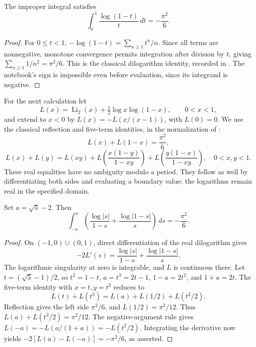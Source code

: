 \begin{proposition}\leavevmode\par\noindent\ours\quad
The improper integral satisfies
\[
 \int_0^1\frac{\log(1-t)}{t}\,dt=-\frac{\pi^2}{6}.
\]
\end{proposition}
\begin{proof}
For \(0\le t<1\), \(-\log(1-t)=\sum_{n\ge1}t^n/n\). Since all terms are nonnegative, monotone convergence permits integration after division by \(t\), giving \(\sum_{n\ge1}1/n^2=\pi^2/6\). This is the classical dilogarithm identity, recorded in \citet[Eqs.~25.12.1--2]{nist2026polylogarithms}. The notebook's sign is impossible even before evaluation, since its integrand is negative.
\end{proof}

For the next calculation let
\[
 L(x)=\operatorname{Li}_2(x)+\tfrac12\log x\log(1-x),\qquad0<x<1,
\]
and extend to \(x<0\) by \(L(x)=-L(x/(x-1))\), with \(L(0)=0\). We use the classical reflection and five-term identities, in the normalization of \citet[Chapter II, \S1.A, pp.~23--24]{zagier2007dilogarithm}:
\[
 L(x)+L(1-x)=\frac{\pi^2}{6},
\]
\[
 L(x)+L(y)=L(xy)+L\!\left(\frac{x(1-y)}{1-xy}\right)
                    +L\!\left(\frac{y(1-x)}{1-xy}\right),\quad0<x,y<1.
\]
These real equalities have no ambiguity modulo a period. They follow as well by differentiating both sides and evaluating a boundary value; the logarithms remain real in the specified domain.

\begin{proposition}\leavevmode\par\noindent\ours\quad
Set \(a=\sqrt5-2\). Then
\[
 \int_{-a}^{a}\left(\frac{\log|s|}{1-s}
                   +\frac{\log|1-s|}{s}\right)\,ds=-\frac{\pi^2}{6}.
\]
\end{proposition}
\begin{proof}
On \((-1,0)\cup(0,1)\), direct differentiation of the real dilogarithm gives
\[
 -2L'(s)=\frac{\log|s|}{1-s}+\frac{\log|1-s|}{s}.
\]
The logarithmic singularity at zero is integrable, and \(L\) is continuous there. Let \(t=(\sqrt5-1)/2\), so \(t^2=1-t\), \(a=t^3=2t-1\), \(1-a=2t^2\), and \(1+a=2t\). The five-term identity with \(x=t,y=t^2\) reduces to
\[
 L(t)+L(t^2)=L(a)+L(1/2)+L(t^2/2).
\]
Reflection gives the left side \(\pi^2/6\), and \(L(1/2)=\pi^2/12\). Thus \(L(a)+L(t^2/2)=\pi^2/12\). The negative-argument rule gives
\(L(-a)=-L(a/(1+a))=-L(t^2/2)\). Integrating the derivative now yields
\(-2[L(a)-L(-a)]=-\pi^2/6\), as asserted.
\end{proof}


